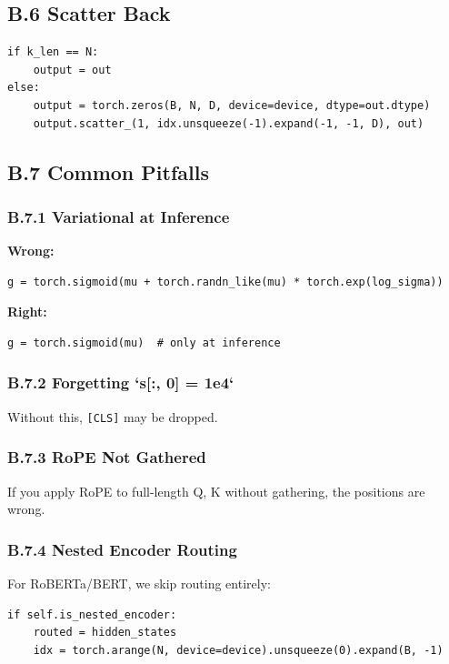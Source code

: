 \subsection{B.6 Scatter Back}

\begin{lstlisting}
if k_len == N:
    output = out
else:
    output = torch.zeros(B, N, D, device=device, dtype=out.dtype)
    output.scatter_(1, idx.unsqueeze(-1).expand(-1, -1, D), out)
\end{lstlisting}

\subsection{B.7 Common Pitfalls}

\subsubsection{B.7.1 Variational at Inference}

\textbf{Wrong:}
\begin{lstlisting}
g = torch.sigmoid(mu + torch.randn_like(mu) * torch.exp(log_sigma))
\end{lstlisting}

\textbf{Right:}
\begin{lstlisting}
g = torch.sigmoid(mu)  # only at inference
\end{lstlisting}

\subsubsection{B.7.2 Forgetting `s[:, 0] = 1e4`}

Without this, \texttt{[CLS]} may be dropped.

\subsubsection{B.7.3 RoPE Not Gathered}

If you apply RoPE to full-length Q, K without gathering, the positions 
are wrong.

\subsubsection{B.7.4 Nested Encoder Routing}

For RoBERTa/BERT, we skip routing entirely:

\begin{lstlisting}
if self.is_nested_encoder:
    routed = hidden_states
    idx = torch.arange(N, device=device).unsqueeze(0).expand(B, -1)
\end{lstlisting}

